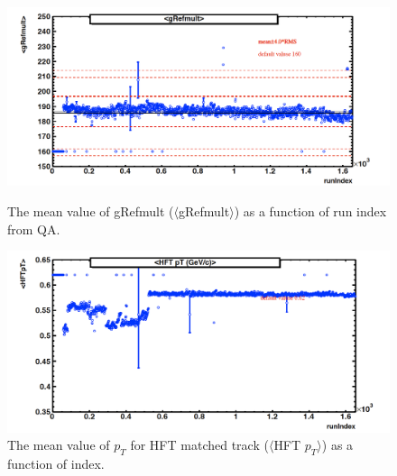 \documentclass[a4paper]{article}
\begin{document}
\begin{figure}[htbp]
\begin{minipage}[htbp]{0.52\linewidth}
\centering
\includegraphics[width=1.0\textwidth]{fig/centrality_grefmult.png}
\caption{The mean value of gRefmult ($\langle$gRefmult$\rangle$) as a function of run index from QA.\label{centrality_QA1}}
\end{minipage}
\hfill
\begin{minipage}[htbp]{0.52\linewidth}
\centering
\includegraphics[width=1.0\textwidth]{fig/centrality_HFTpt.png} 
\caption{The mean value of $p_{T}$ for HFT matched track ($\langle$HFT $p_{T}$$\rangle$) as a function of index.\label{centrality_QA2}}
\end{minipage}
\end{figure}
\end{document}
